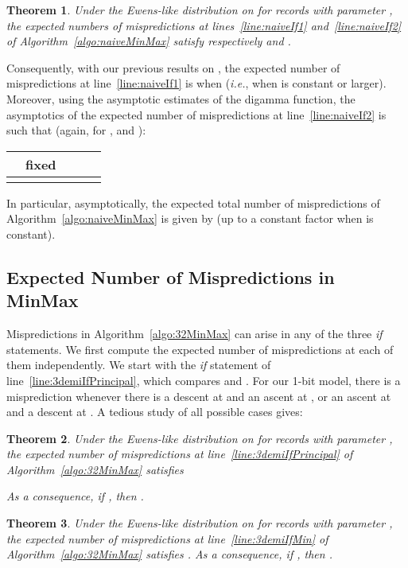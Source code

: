 \documentclass[proceedings]{aofa}
\newtheorem{theorem}{Theorem}
\begin{document}
\begin{theorem} \label{thm:misprediction_naive}
Under the Ewens-like distribution on  for records with parameter , 
the expected numbers of mispredictions at lines~\ref{line:naiveIf1} and~\ref{line:naiveIf2} of Algorithm~\ref{algo:naiveMinMax} satisfy respectively
 and 
.
\end{theorem}
Consequently, with our previous results on , 
the expected number of mispredictions at line~\ref{line:naiveIf1} is  when  (\emph{i.e.}, when  is constant or larger). 
Moreover, using the asymptotic estimates of the digamma function, 
the asymptotics of the expected number of mispredictions at line~\ref{line:naiveIf2} is such that (again, for ,  and ): 
\begin{center}
\begin{tabular}{c|c|c|c|c}
& fixed  &   &  &  \\
\hline 
 &  &  &  & 
\end{tabular}
\end{center}
In particular, asymptotically, the expected total number of mispredictions of Algorithm~\ref{algo:naiveMinMax} is given by  
(up to a constant factor when  is constant). 

\subsection{Expected Number of Mispredictions in \texorpdfstring{}-MinMax}\label{sec:optimal}

Mispredictions in Algorithm~\ref{algo:32MinMax} can arise in any of the three \emph{if} statements. 
We first compute the expected number of mispredictions at each of them independently. 
We start with the \emph{if} statement of line~\ref{line:3demiIfPrincipal}, which compares  and . For our 1-bit model, there is a misprediction whenever
there is a descent at  and an ascent at , or an ascent at  and a descent at . A tedious study of all possible cases gives:

\begin{theorem}\label{thm:32-first-if}
Under the Ewens-like distribution on  for records with parameter , 
the expected number of mispredictions at line~\ref{line:3demiIfPrincipal} of Algorithm~\ref{algo:32MinMax} satisfies

As a consequence,
if , then . 
\end{theorem}


\begin{theorem}\label{thm:32-second-if}
Under the Ewens-like distribution on  for records with parameter , 
the expected number of mispredictions at line~\ref{line:3demiIfMin} of Algorithm~\ref{algo:32MinMax} satisfies
. As a consequence, if , then . 
\end{theorem}
\end{document}

